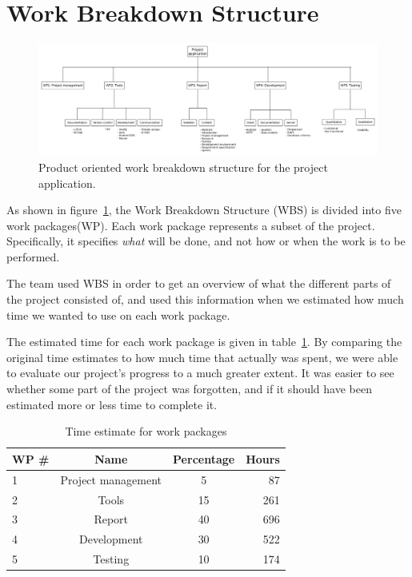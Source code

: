 \section{Work Breakdown Structure}

\begin{figure}[H]
\includegraphics[width=\textwidth]{ch/planning/fig/wbs.png}
\caption{Product oriented work breakdown structure for the project application.}
\label{fig:wbs}
\end{figure}

As shown in figure~\ref{fig:wbs}, the Work Breakdown Structure (WBS) is divided into five work packages(WP). Each work package represents a subset of the project. Specifically, it specifies \emph{what} will be done, and not how or when the work is to be performed.

The team used WBS in order to get an overview of what the different parts of the project consisted of, and used this information when we estimated how much time we wanted to use on each work package.

The estimated time for each work package is given in table~\ref{tab:timeEstWP}. By comparing the original time estimates to how much time that actually was spent, we were able to evaluate our project's progress to a much greater extent. It was easier to see whether some part of the project was forgotten, and if it should have been estimated more  or less time to complete it.

\begin{table}[H]
\centering
{}
\begin{tabular}{|l|c|c|r|}
\hline
    \textbf{WP \#} & \textbf{Name} & \textbf{Percentage} & \textbf{Hours} \\\hline
    1 & Project management & 5 & 87\\\hline
    2 & Tools 			   & 15 & 261\\\hline
    3 & Report 			   & 40 & 696\\\hline
    4 & Development 	   & 30 & 522\\\hline
    5 & Testing  		   & 10 & 174\\\hline
\end{tabular}
\caption{Time estimate for work packages}
\label{tab:timeEstWP}
\end{table}